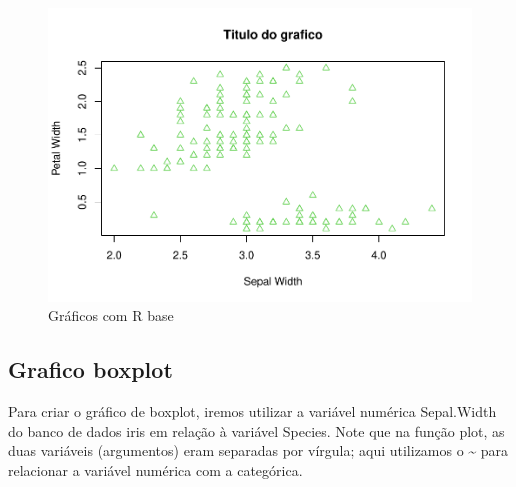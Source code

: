 \documentclass[
]{book}
\newenvironment{Shaded}{\begin{snugshade}}{\end{snugshade}}
\newcommand{\CommentTok}[1]{\textcolor[rgb]{0.56,0.35,0.01}{\textit{#1}}}
\newcommand{\FunctionTok}[1]{\textcolor[rgb]{0.13,0.29,0.53}{\textbf{#1}}}
\newcommand{\NormalTok}[1]{#1}
\newcommand{\SpecialCharTok}[1]{\textcolor[rgb]{0.81,0.36,0.00}{\textbf{#1}}}
\begin{document}
\begin{figure}
\centering
\includegraphics{_main_files/figure-latex/nome-do-chunk2-6.pdf}
\caption{\label{fig:nome-do-chunk2-6}Gráficos com R base}
\end{figure}

\hypertarget{grafico-boxplot}{%
\subsection{Grafico boxplot}\label{grafico-boxplot}}

Para criar o gráfico de boxplot, iremos utilizar a variável numérica Sepal.Width do banco de dados iris em relação à variável Species. Note que na função plot, as duas variáveis (argumentos) eram separadas por vírgula; aqui utilizamos o \textbf{\textasciitilde{}} para relacionar a variável numérica com a categórica.

\begin{Shaded}
\end{Shaded}
\end{document}
